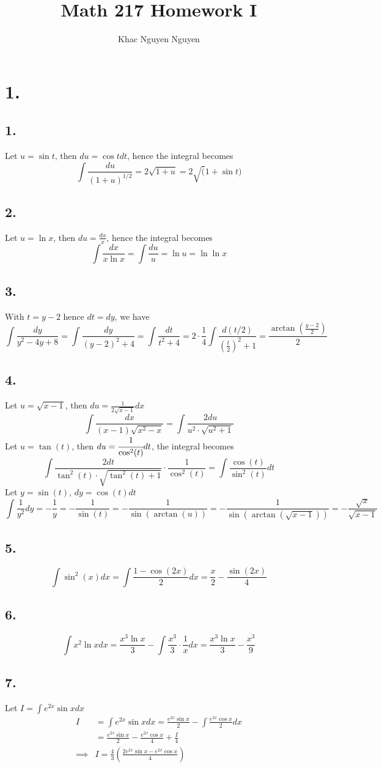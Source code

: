 \documentclass[11pt]{article}
\title{\textbf{Math 217 Homework I}}
\author{Khac Nguyen Nguyen}
\date{}
\begin{document}
\section*{1.}
\subsection*{1.}
Let $u = \sin t$, then $du = \cos t dt$, hence the integral becomes
\[
    \int \frac{du}{(1+u)^{1/2}} = 2\sqrt{1+u} = 2\sqrt(1+\sin t)
\]
\subsection*{2.}
Let $u = \ln x$, then $du = \frac{dx}{x}$, hence the integral becomes
\[
    \int \frac{dx}{x\ln x} = \int \frac{du}{u} = \ln u = \ln\ln x    
\]
\subsection*{3.}
With $t=y-2$ hence $dt = dy$, we have
\[
    \int \frac{dy}{y^2-4y+8} = \int \frac{dy}{(y-2)^2 +4} = \int \frac{dt}{t^2+4} = 2\cdot \frac{1}{4} \int \frac{d(t/2)}{\left(\frac{t}{2}\right)^2 + 1} =\frac{\arctan(\frac{y-2}{2})}{2}
\]
\subsection*{4.}
Let $u = \sqrt{x-1}$, then $du = \frac{1}{2\sqrt{x-1}} dx$
\[
    \int \frac{dx}{(x-1)\sqrt{x^2-x}} = \int \frac{2du}{u^2 \cdot \sqrt{u^2+1}}
\]
Let $u=\tan(t)$, then $du = \cfrac{1}{\cos^2(t)}dt$, the integral becomes
\[
    \int \frac{2dt}{\tan^2(t) \cdot \sqrt{\tan^2(t)+1}} \cdot \frac{1}{\cos^2(t)} = \int \frac{\cos(t)}{\sin^2(t)}dt 
\]
Let $y = \sin(t)$, $dy = \cos(t) dt$
\[
    \int \frac{1}{y^2} dy = -\frac{1}{y} = - \frac{1}{\sin(t)} = -\frac{1}{\sin(\arctan(u))} = -\frac{1}{\sin(\arctan(\sqrt{x-1}))} = - \frac{\sqrt{x}}{\sqrt{x-1}}
\]
\subsection*{5.}
\[
    \int \sin^2(x) dx = \int \frac{1-\cos(2x)}{2} dx = \frac{x}{2} - \frac{\sin(2x)}{4}
\]
\subsection*{6.}
\[
    \int x^2\ln x dx = \frac{x^3 \ln x}{3} - \int \frac{x^3}{3} \cdot \frac{1}{x} dx = \frac{x^3 \ln x}{3} - \frac{x^3}{9}
\]
\subsection*{7.}
Let $I = \int e^{2x} \sin x dx$ 
\begin{equation*}
    \begin{aligned}
        I &= \int e^{2x} \sin x dx = \frac{e^{2x} \sin x}{2} - \int \frac{e^{2x} \cos x}{2} dx \\
        &= \frac{e^{2x}\sin x}{2} - \frac{e^{2x} \cos x}{4} + \frac{I}{4} \\
        \implies & I = \frac{4}{3} \left(\frac{2e^{2x}\sin x - e^{2x} \cos x}{4}\right) 
    \end{aligned}
\end{equation*}
\end{document}
